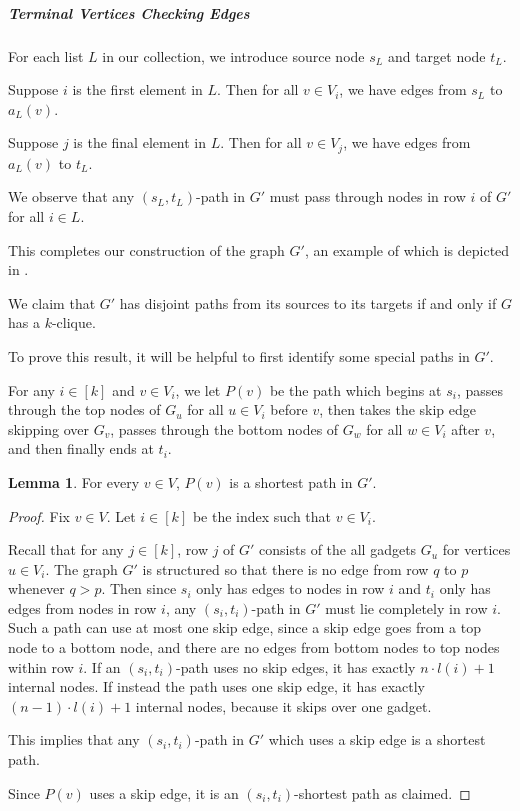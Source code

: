 \documentclass[11pt]{article}
\DeclareMathOperator{\pos}{pos}
\theoremstyle{definition}
\newtheorem{lemma}[theorem]{Lemma}
\begin{document}
    \subparagraph{Terminal Vertices Checking Edges}\hfill

    For each list $L$ in our collection, we introduce source node $s_L$ and target node $t_L$.
    
    Suppose $i$ is the first element in $L$.
    Then for all $v\in V_i$, we have edges from $s_L$ to $a_L(v)$.

    Suppose $j$ is the final element in $L$.
    Then for all $v\in V_j$, we have edges from $a_L(v)$ to $t_L$.

    We observe that any $(s_L,t_L)$-path in $G'$ must  pass through nodes in row $i$ of $G'$ for all $i\in L$.

    \hfill
    
    This completes our construction of the graph $G'$, an example of which is depicted in .
    
    We claim that $G'$ has disjoint paths from its sources to its targets if and only if $G$ has a $k$-clique.

    To prove this result, it will be helpful to first identify some special paths in $G'$.

    For any $i\in [k]$ and $v\in V_i$, we let $P(v)$ be the path which begins at $s_i$, passes through the top nodes of $G_u$ for all  $u\in V_i$ before $v$, then takes the skip edge skipping over $G_v$, passes through the bottom nodes of $G_w$ for all $w\in V_i$ after $v$, and then finally ends at $t_i$.

    \begin{lemma}
        \label{lem:row-sp}
        For every $v\in V$, $P(v)$ is a shortest path in $G'$.
    \end{lemma}
    \begin{proof}
        Fix $v\in V$.
        Let $i\in [k]$ be the index such that $v\in V_i$.

        Recall that for any $j\in [k]$, row $j$ of $G'$ consists of the all gadgets $G_u$ for vertices $u\in V_i$.
        The graph $G'$ is structured so that there is no edge from row $q$ to $p$ whenever $q > p$.
        Then since $s_i$ only has edges to nodes in row $i$ and $t_i$ only has edges from nodes in row $i$, any $(s_i,t_i)$-path in $G'$ must lie completely in row $i$.
        Such a path can use at most one skip edge, since a skip edge goes from a top node to a bottom node, and there are no edges from bottom nodes to top nodes within row $i$.
        If an $(s_i,t_i)$-path uses no skip edges, it has exactly $n\cdot l(i) + 1$ internal nodes.
        If instead the path uses one skip edge, it has exactly $(n-1)\cdot l(i)+1$ internal nodes, because it skips over one gadget.
        
        This implies that any $(s_i,t_i)$-path in $G'$ which uses a skip edge is a shortest path.
        
        Since $P(v)$ uses a skip edge, it is an $(s_i,t_i)$-shortest path as claimed.
    \end{proof}
        
\end{document}
